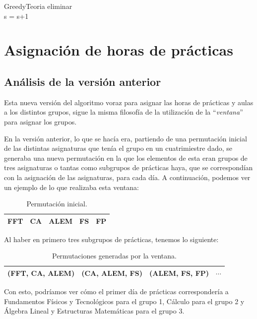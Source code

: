 \begin{pseudocode}{GreedyTeoria}{ }
      \IF eliminar \THEN {}\\
      \ELSE s = s+1 \\
    \END
  \END 
\END
\end{pseudocode}

\section{Asignación de horas de prácticas}

\subsection{Análisis de la versión anterior}

Esta nueva versión del algoritmo voraz para asignar las horas de prácticas y aulas a los distintos grupos, sigue la misma filosofía de la utilización de la ``\textit{ventana}'' para asignar los grupos. 

En la versión anterior, lo que se hacía era, partiendo de una permutación inicial de las distintas asignaturas que tenía el grupo en un cuatrimiestre dado, se generaba una nueva permutación en la que los elementos de esta eran grupos de tres asignaturas o tantas como subgrupos de prácticas haya, que se correspondían con la asignación de las asignaturas, para cada día. A continuación, podemos ver un ejemplo de lo que realizaba esta ventana:
\begin{table}[H]
\begin{center}
\begin{tabular}{|c|c|c|c|c|}
\hline
FFT & CA & ALEM & FS & FP\\
\hline
\end{tabular}
\caption{Permutación inicial.}
\end{center}
\end{table}
Al haber en primero tres subgrupos de prácticas, tenemos lo siguiente:
\begin{table}[H]
\begin{center}
\begin{tabular}{|c|c|c|c|}
\hline
(FFT, CA, ALEM) & (CA, ALEM, FS) & (ALEM, FS, FP) & $\cdots$ \\
\hline
\end{tabular}
\caption{Permutaciones generadas por la ventana.}
\end{center}
\end{table}

Con esto, podríamos ver cómo el primer día de prácticas correspondería a Fundamentos Físicos y Tecnológicos para el grupo 1, Cálculo para el grupo 2 y Álgebra Lineal y Estructuras Matemáticas para el grupo 3.

